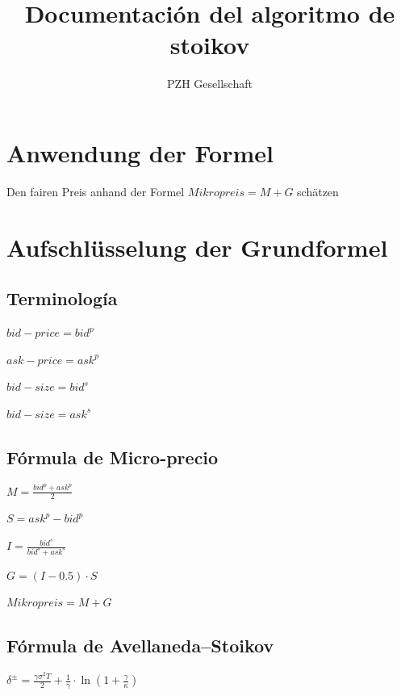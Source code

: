 \documentclass[11pt]{article}
\begin{document}
\title{Documentación del algoritmo de stoikov}
\author{PZH Gesellschaft}
\maketitle


\begin{abstract}
\end{abstract}


\section{Anwendung der Formel}

Den fairen Preis anhand der Formel $Mikropreis = M + G$ schätzen

\section{Aufschlüsselung der Grundformel}

\subsection{Terminología}

$bid-price = bid^p$

$ask-price = ask^p$

$bid-size  = bid^s$

$bid-size  = ask^s$

\subsection{Fórmula de Micro-precio}

$M = \frac{bid^p + ask^p}{2}$

$S = ask^p - bid^p$

$I = \frac{bid^s}{bid^s + ask^s}$

$G = \left(I - 0.5\right) \cdot S$

$Mikropreis = M + G$

\subsection{Fórmula de Avellaneda–Stoikov}

$\delta^{\pm} = \frac{\gamma \sigma^2 T}{2} + \frac{1}{\gamma} \cdot \ln\left(1 + \frac{\gamma}{\kappa}\right)$
\end{document}
